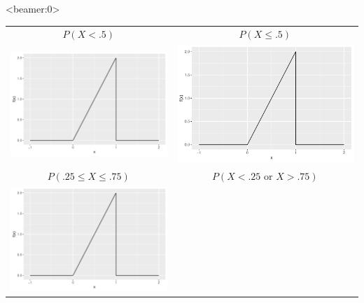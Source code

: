 \begin{frame}<beamer:0>
  \begin{block}{\examplectd}
    \begin{tabular}{cc}
      $P(X < .5)$
      & $P(X \leq .5)$\\
      \includegraphics[height=.325\textheight]{figure/example-16-1-1}
      & \includegraphics[height=.325\textheight]{figure/example-16-1-1}\\
      $P(.25 \leq X \leq .75)$
      & $P(X<.25 \mbox{ or } X >.75)$\\
      \includegraphics[height=.325\textheight]{figure/example-16-1-1}

\end{tabular}
\end{block}
\end{frame}
